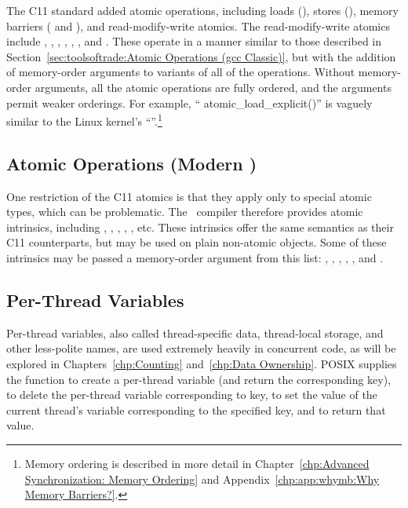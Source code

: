 The C11 standard added atomic operations,
including loads (),
stores (),
memory barriers ( and
), and read-modify-write atomics.
The read-modify-write atomics include
,
,
,
,
,
,
and
.
These operate in a manner similar to those described in
Section~\ref{sec:toolsoftrade:Atomic Operations (gcc Classic)},
but with the addition of memory-order arguments to 
variants of all of the operations.
Without memory-order arguments, all the atomic operations are
fully ordered, and the arguments permit weaker orderings.
For example, ``
{atomic_load_explicit()}''
is vaguely similar to the Linux kernel's ``''.\footnote{
	Memory ordering is described in more detail in
	Chapter~\ref{chp:Advanced Synchronization: Memory Ordering} and
	Appendix~\ref{chp:app:whymb:Why Memory Barriers?}.}

\subsection{Atomic Operations (Modern \GCC)}
\label{sec:toolsoftrade:Atomic Operations (Modern gcc)}

One restriction of the C11 atomics is that they apply only to special
atomic types, which can be problematic.
The \GNUC\ compiler therefore provides atomic intrinsics, including
,
,
,
,
, etc.
These intrinsics offer the same semantics as their C11 counterparts,
but may be used on plain non-atomic objects.
Some of these intrinsics may be passed a memory-order argument from
this list:
,
,
,
,
, and
.

\subsection{Per-Thread Variables}
\label{sec:toolsoftrade:Per-Thread Variables}

Per-thread variables, also called thread-specific data, thread-local
storage, and other less-polite names, are used extremely
heavily in concurrent code, as will be explored in
Chapters~\ref{chp:Counting} and~\ref{chp:Data Ownership}.
POSIX supplies the  function to create a
per-thread variable (and return the corresponding key),
 to delete the per-thread variable corresponding
to key,
 to set the value of the current thread's
variable corresponding to the specified key,
and  to return that value.

